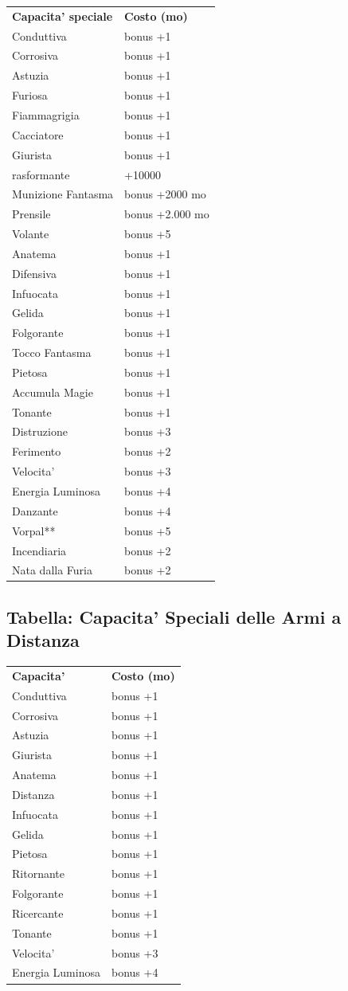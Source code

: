 \documentclass[a4paper,11pt,twoside,openany]{book}
\begin{document}
{		\begin{tabular}{ll}
			\toprule
			\textbf{Capacita' speciale} & \textbf{Costo (mo)}\tabularnewline
			Conduttiva \index{Conduttiva} & bonus +1\tabularnewline
			Corrosiva\index{Corrosiva} & bonus +1\tabularnewline
			Astuzia \index{Astuzia}& bonus +1\tabularnewline
			Furiosa \index{Furiosa} & bonus +1\tabularnewline
			Fiammagrigia \index{Fiammagrigia}& bonus +1\tabularnewline
			Cacciatore \index{Cacciatore} & bonus +1\tabularnewline
			Giurista \index{Giurista} & bonus +1\tabularnewline
			rasformante \index{Trasformante} & +10000\tabularnewline
			Munizione Fantasma \index{Munizione Fantasma} & bonus +2000 mo\tabularnewline
			Prensile \index{Prensile}& bonus +2.000 mo\tabularnewline
			Volante \index{Volante}& bonus +5\tabularnewline
			Anatema\index{Anatema} & bonus +1\tabularnewline
			Difensiva\index{Difensiva} & bonus +1\tabularnewline
			Infuocata \index{Infuocata}& bonus +1\tabularnewline
			Gelida \index{Gelida} & bonus +1\tabularnewline
			Folgorante \index{Folgorante} & bonus +1\tabularnewline
			Tocco Fantasma \index{Tocco Fantasma} & bonus +1\tabularnewline
			Pietosa \index{Pietosa} & bonus +1\tabularnewline
			Accumula Magie \index{Accumula Magie} & bonus +1\tabularnewline
			Tonante \index{Tonante} & bonus +1\tabularnewline
			Distruzione \index{Distruzione}& bonus +3\tabularnewline
			Ferimento \index{Ferimento} & bonus +2\tabularnewline
			Velocita' \index{Velocita'} & bonus +3\tabularnewline
			Energia Luminosa \index{Energia Luminosa}& bonus +4\tabularnewline
			Danzante \index{Danzante} & bonus +4\tabularnewline
			Vorpal** \index{Vorpal} & bonus +5\tabularnewline
			Incendiaria \index{Incendiaria} & bonus +2\tabularnewline
			Nata dalla Furia \index{Nata dalla Furia} & bonus +2\tabularnewline
		\end{tabular}
		
		\subsection{Tabella: Capacita' Speciali delle Armi a Distanza}
		
		\label{tabella-capacita-speciali-delle-armi-a-distanza}
		
		\begin{tabular}{ll}
			\toprule
			\textbf{Capacita'} & \textbf{Costo (mo)}\tabularnewline
			Conduttiva \index{Conduttiva}& bonus +1\tabularnewline
			Corrosiva\index{Corrosiva} & bonus +1\tabularnewline
			Astuzia \index{Astuzia} & bonus +1\tabularnewline
			Giurista\index{Giurista} & bonus +1\tabularnewline
			Anatema \index{Anatema} & bonus +1\tabularnewline
			Distanza\index{Distanza} & bonus +1\tabularnewline
			Infuocata\index{Infuocata} & bonus +1\tabularnewline
			Gelida \index{Gelida}& bonus +1\tabularnewline
			Pietosa \index{Pietosa}& bonus +1\tabularnewline
			Ritornante \index{Ritornante}& bonus +1\tabularnewline
			Folgorante\index{Folgorante} & bonus +1\tabularnewline
			Ricercante \index{Ricercante} & bonus +1\tabularnewline
			Tonante \index{Tonante}& bonus +1\tabularnewline
			Velocita' \index{Velocita'} & bonus +3\tabularnewline
			Energia Luminosa\index{Energia Luminosa} & bonus +4\tabularnewline
			

\end{tabular}}
\end{document}
